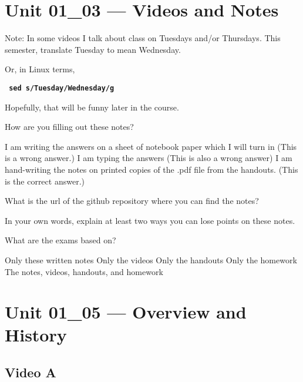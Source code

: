 \documentclass[letterpaper,12pt]{exam}
\begin{document}
\section*{Unit 01\_03 --- Videos and Notes} %

Note:  In some videos I talk about class on Tuesdays and/or Thursdays.  This semester, translate Tuesday to mean Wednesday.  

Or, in Linux terms, 

     \texttt{\textbf{    sed s/Tuesday/Wednesday/g}}

Hopefully, that will be funny later in the course.


\begin{questions}
\question How are you filling out these notes?
\begin{checkboxes}
\choice I am writing the answers on a sheet of notebook paper which I will turn in (This is a wrong answer.)
\choice I am typing the answers (This is also a wrong answer)
\choice I am hand-writing the notes on printed copies of the .pdf file from the handouts. (This is the correct answer.)
\end{checkboxes}

\question What is the url of the github repository where you can find the notes? 
\vspace{.75cm}

\question In your own words, explain at least two ways you can lose points on these notes. 
\vspace{1.5cm}

\question What are the exams based on?
\begin{checkboxes}
\choice Only these written notes
\choice Only the videos
\choice Only the handouts
\choice Only the homework
\choice The notes, videos, handouts, and homework
\end{checkboxes}

\end{questions}
\section*{Unit 01\_05 --- Overview and History}
\subsection*{Video A}
\end{document}
